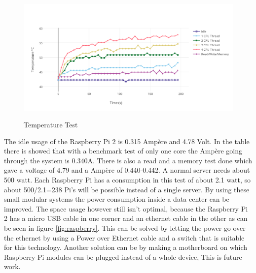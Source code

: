 \documentclass{sig-alternate-br}
\begin{document}
\begin{figure}[H]
	\includegraphics[scale=0.37]{Temperature_Test.png}
	\label{fig:temp}
	\caption{Temperature Test}
\end{figure}

The idle usage of the Raspberry Pi 2 is 0.315 Ampère and 4.78 Volt. In the table there is showed that with a benchmark test of only one core the Ampère going through the system is  0.340A. There is also a read  and a memory test done which gave a voltage of 4.79 and a Ampère of 0.440-0.442.  A normal server needs about 500 watt. Each Raspberry Pi has a consumption in this test of about 2.1 watt, so about 500/2.1=238 Pi's will be possible instead of a single server. By using these small modular systems the power consumption inside a data center can be improved. The space usage however still isn't optimal, because the Raspberry Pi 2 has a micro USB cable  in one corner and an ethernet cable in the other as can be seen in figure \ref{fig:raspberry}. 
This can be solved by letting the power go over the ethernet by using a Power over Ethernet cable and a switch that is suitable for this technology. Another solution can be by making a motherboard on which  Raspberry Pi modules can be plugged instead of a whole device, This is future work. 
\end{document}
